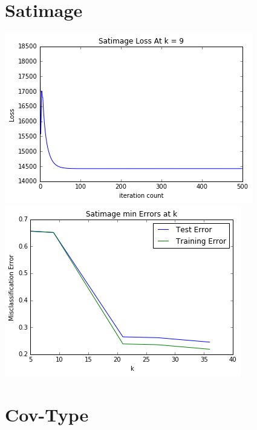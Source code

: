 \documentclass[letter]{article} %
\begin{document}
\setlength{\headsep}{0.5 in}

\section*{Satimage}

\includegraphics[scale=1]{sat_loss} \\
\includegraphics[scale=1]{sat_err}


\section*{Cov-Type}
\end{document}
